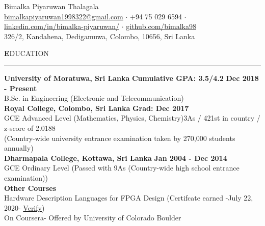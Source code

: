 \documentclass[legalpaper,11pt]{article}
\begin{document}
\begin{center}
	{\Huge \sc Bimalka Piyaruwan Thalagala}\\
	{\small
	\href{mailto:bimalkapiyaruwan1998322@gmail.com}{bimalkapiyaruwan1998322@gmail.com} %
	 $\cdot$ +94 75 029 6594 %
	 $\cdot$ \href{https://www.linkedin.com/in/bimalka-piyaruwan/}{linkedin.com/in/bimalka-piyaruwan/}
	 $\cdot$ \href{https://github.com/bimalka98}{github.com/bimalka98}\\
	326/2,
	Kandahena,
	Dedigamuwa, Colombo, 10656,
	Sri Lanka}
\end{center}
\vspace{5mm}


\textbf{\Large E}DUCATION

\vspace{2mm}\hrule\vspace{5mm}
\setlength{\leftskip}{5mm}

\textbf{\large University of Moratuwa, Sri Lanka}\hspace{6mm} \textbf{\large Cumulative GPA: 3.5/4.2} \hfill \textbf{\large Dec 2018 - Present}\\
B.Sc. in Engineering (Electronic and Telecommunication)\\

\textbf{\large Royal College, Colombo, Sri Lanka} \hfill \textbf{\large Grad: Dec 2017}\\
GCE Advanced Level (Mathematics, Physics, Chemistry)\hfill 3As / 421st in country / z-score of 2.0188\\
(Country-wide university entrance examination taken by 270,000 students annually)\\

\textbf{\large Dharmapala College, Kottawa, Sri Lanka} \hfill \textbf{\large Jan 2004 - Dec 2014}\\
GCE Ordinary Level (Passed with 9As (Country-wide high school entrance examination))\\

\textbf{\large Other Courses}\\
Hardware Description Languages for FPGA Design \hfill (Certifcate earned -July 22, 2020- \href{https://coursera.org/share/92d9165909e39bee309b138a8faa42d1}{Verify})\\
\hspace{5mm}On Coursera- Offered by University of Colorado Boulder\\
\end{document}
